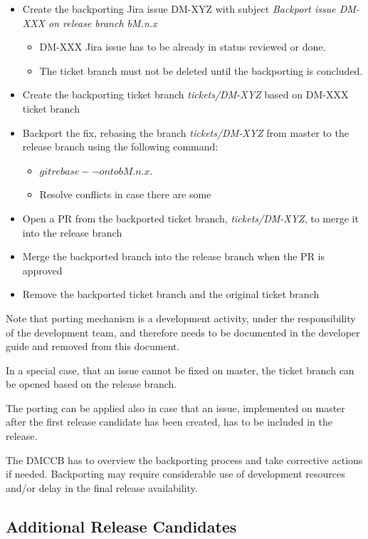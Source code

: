 \begin{itemize}
\item Create the backporting Jira issue DM-XYZ with subject \textit{Backport issue DM-XXX on release branch bM.n.x}
  \begin{itemize}
  \item DM-XXX Jira issue has to be already in status reviewed or done.
  \item The ticket branch must not be deleted until the backporting is concluded.
  \end{itemize}
\item Create the backporting ticket branch \textit{tickets/DM-XYZ}  based on DM-XXX ticket branch
\item Backport the fix, rebasing the branch \textit{tickets/DM-XYZ} from master to the release branch using the following command:
  \begin{itemize}
   \item $git rebase --onto bM.n.x$.
   \item Resolve conflicts in case there are some
  \end{itemize}
\item Open a PR from the backported ticket branch, \textit{tickets/DM-XYZ}, to merge it into the release branch
\item Merge the backported branch into the release branch when the PR is approved
\item Remove the backported ticket branch and the original ticket branch
\end{itemize}

Note that porting mechanism is a development activity, under the responsibility of the development team, and therefore needs to be documented in the developer guide and removed from this document.

In a special case, that an issue cannot be fixed on master, the ticket branch can be opened based on the release branch.

The porting can be applied also in case that an issue, implemented on master after the first release candidate has been created, has to be included in the release.

The DMCCB has to overview the backporting process and take corrective actions if needed. 
Backporting may require considerable use of development resources and/or delay in the final release availability.


\subsection{Additional Release Candidates} \label{sec:newrc}

